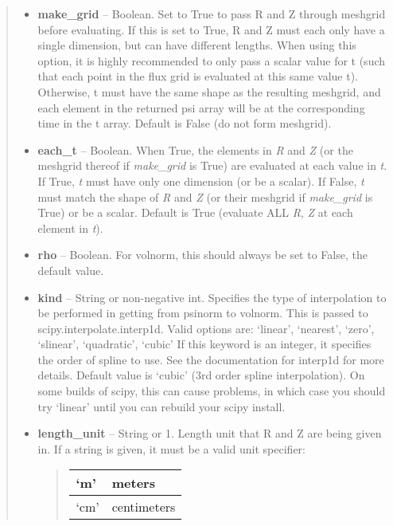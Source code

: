 \documentclass[letterpaper,10pt,english]{sphinxmanual}
\begin{document}
\begin{fulllineitems}
\begin{fulllineitems}
\begin{quote}
\begin{description}
\begin{itemize}
\item {} 
\textbf{make\_grid} --
Boolean.
Set to True to pass R and Z through meshgrid
before evaluating. If this is set to True, R and Z must each
only have a single dimension, but can have different lengths.
When using this option, it is highly recommended to only pass
a scalar value for t (such that each point in the flux grid is
evaluated at this same value t). Otherwise, t must have the
same shape as the resulting meshgrid, and each element in the
returned psi array will be at the corresponding time in the t
array. Default is False (do not form meshgrid).

\item {} 
\textbf{each\_t} --
Boolean.
When True, the elements in \emph{R} and \emph{Z} (or the meshgrid thereof
if \emph{make\_grid} is True) are evaluated at each value in \emph{t}. If
True, \emph{t} must have only one dimension (or be a scalar). If
False, \emph{t} must match the shape of \emph{R} and \emph{Z} (or their
meshgrid if \emph{make\_grid} is True) or be a scalar. Default is True
(evaluate ALL \emph{R}, \emph{Z} at each element in \emph{t}).

\item {} 
\textbf{rho} --
Boolean.
For volnorm, this should always be set to False, the
default value.

\item {} 
\textbf{kind} --
String or non-negative int.
Specifies the type of interpolation
to be performed in getting from psinorm to volnorm. This is
passed to scipy.interpolate.interp1d. Valid options are:
`linear', `nearest', `zero', `slinear', `quadratic', `cubic'
If this keyword is an integer, it specifies the order of spline
to use. See the documentation for interp1d for more details.
Default value is `cubic' (3rd order spline interpolation). On
some builds of scipy, this can cause problems, in which case
you should try `linear' until you can rebuild your scipy install.

\item {} 
\textbf{length\_unit} --
String or 1.
Length unit that R and Z are being given
in. If a string is given, it must be a valid unit specifier:
\begin{quote}

\begin{tabulary}{\linewidth}{|L|L|}
\hline

`m'
 & 
meters
\\\hline

`cm'
 & 
centimeters
\\\hline


\end{tabulary}
\end{quote}
\end{itemize}
\end{description}
\end{quote}
\end{fulllineitems}
\end{fulllineitems}
\end{document}
